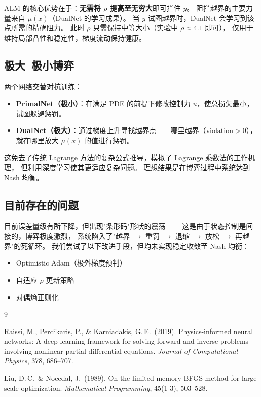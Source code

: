 \documentclass[UTF8, 12pt]{ctexart}
\begin{document}
ALM 的核心优势在于：\textbf{无需将 $\rho$ 提高至无穷大}即可拦住 $y$。
阻拦越界的主要力量来自 $\mu(x)$（DualNet 的学习成果）。
当 $y$ 试图越界时，DualNet 会学习到该点所需的精确阻力。
此时 $\rho$ 只需保持中等大小（实验中 $\rho\approx 4.1$ 即可），
仅用于维持局部凸性和稳定性，梯度流动保持健康。

\subsection{极大--极小博弈}

两个网络交替对抗训练：
\begin{itemize}
  \item \textbf{PrimalNet（极小）}：在满足 PDE 的前提下修改控制力 $u$，使总损失最小，试图躲避惩罚。
  \item \textbf{DualNet（极大）}：通过梯度上升寻找越界点——哪里越界（$\mathrm{violation}>0$），就在哪里放大 $\mu(x)$ 的值进行惩罚。
\end{itemize}
这免去了传统 Lagrange 方法的复杂公式推导，模拟了 Lagrange 乘数法的工作机理，
但利用深度学习使其更适应复杂问题。
理想结果是在博弈过程中系统达到 Nash 均衡。

\subsection{目前存在的问题}

目前误差量级有所下降，但出现"条形码"形状的震荡——
这是由于状态控制是间接的，博弈极度激烈，
系统陷入了"越界 $\to$ 重罚 $\to$ 退缩 $\to$ 放松 $\to$ 再越界"的死循环。
我们尝试了以下改进手段，但均未实现稳定收敛至 Nash 均衡：
\begin{itemize}
  \item Optimistic Adam（极外梯度预判）
  \item 自适应 $\rho$ 更新策略
  \item 对偶熵正则化
\end{itemize}


\begin{thebibliography}{9}

Raissi, M., Perdikaris, P., \& Karniadakis, G.\,E.\ (2019).
Physics-informed neural networks: A deep learning framework for solving forward and inverse problems involving nonlinear partial differential equations.
\textit{Journal of Computational Physics}, 378, 686--707.

Liu, D.\,C.\ \& Nocedal, J.\ (1989).
On the limited memory BFGS method for large scale optimization.
\textit{Mathematical Programming}, 45(1-3), 503--528.

\end{thebibliography}
\end{document}
